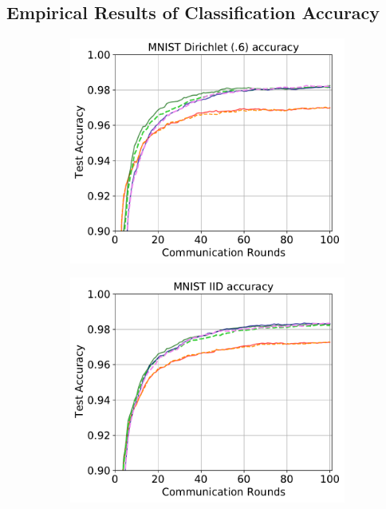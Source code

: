 \documentclass{article} %
\begin{document}
\clearpage

\subsection{Empirical Results of Classification Accuracy}

\begin{figure}[ht!]
\begin{subfigure}{.5\textwidth}
  \centering
  \includegraphics[width=.8\linewidth]{textfigure/mnist_0.6.pdf}
  \label{fig:sub1-first}
\end{subfigure}
\begin{subfigure}{.5\textwidth}
  \centering
  \includegraphics[width=.8\linewidth]{textfigure/mnist_iid.pdf}
  \label{fig:sub1-second}
\end{subfigure}
\begin{subfigure}{.5\textwidth}
  \centering

\end{subfigure}
\end{figure}
\end{document}
